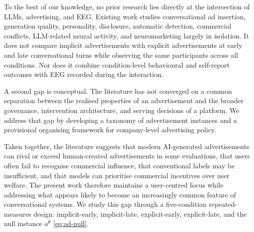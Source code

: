 \documentclass[english]{article}
\begin{document}



To the best of our knowledge, no prior research lies directly at the intersection
of LLMs, advertising, and EEG. Existing work studies conversational ad insertion,
generation quality, personality, disclosure, automatic detection, commercial
conflicts, LLM-related neural activity, and neuromarketing largely in isolation. It
does not compare implicit advertisements with explicit advertisements
at early and late conversational turns while observing the same participants across
all conditions. Nor does it combine condition-level behavioural and self-report
outcomes with EEG recorded during the interaction.

A second gap is conceptual. The literature has not converged on a common
separation between the realised properties of an advertisement and the
broader governance, intervention architecture, and serving decisions of a
platform. We address that gap by developing a taxonomy of advertisement
instances and a provisional organising framework for company-level
advertising policy.


Taken together, the literature suggests that modern AI-generated advertisements can
rival or exceed human-created advertisements in some evaluations, that users often
fail to recognise commercial influence, that conventional labels may be
insufficient, and that models can prioritise commercial incentives over user
welfare. The present work therefore maintains a user-centred focus while addressing
what appears likely to become an increasingly common feature of conversational
systems. We study this gap through a five-condition repeated-measures design:
implicit-early, implicit-late, explicit-early, explicit-late, and the
null instance \(a^{\emptyset}\) \eqref{eq:ad-null}.

\color{black}



\end{document}
